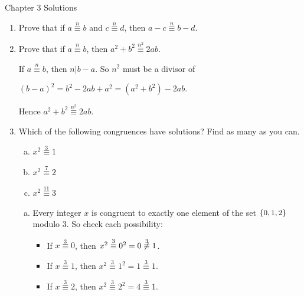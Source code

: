\documentclass[11pt,fleqn,dvipsnames,usenames]{article}
\renewcommand{\headrulewidth}{1pt}
\begin{document}
\fancyhead[L]{\course}
\fancyhead[R]{\term}
\renewcommand{\headrulewidth}{0.4pt}

{\huge Chapter 3 Solutions}
\vsp

\begin{enumerate}
\item Prove that if $a\overset{n}{\equiv}b$ and $c\overset{n}{\equiv}d$, then $a-c\overset{n}{\equiv}b-d$.
\item Prove that if $a\overset{n}{\equiv}b$, then $a^2 + b^2\overset{n^2}{\equiv}2ab$.
\vsmsp

\solution If $a\overset{n}{\equiv}b$, then $n|b-a$.  So $n^2$ must be a divisor of
\begin{center}
$(b-a)^2 = b^2 - 2ab + a^2 = (a^2 + b^2) - 2ab$.
\end{center}
Hence $a^2 + b^2\overset{n^2}{\equiv}2ab$.
\item Which of the following congruences have solutions?  Find as many as you can.
\begin{enumerate}[(a)]
\item $x^2\overset{3}{\equiv}1$
\item $x^2\overset{7}{\equiv}2$
\item $x^2\overset{11}{\equiv}3$
\end{enumerate}
\vsmsp

\solution
\begin{enumerate}[(a)]
\item Every integer $x$ is congruent to exactly one element of the set $\left\{0,1,2\right\}$ modulo $3$.  So check each possibility:
\begin{itemize}[\ ]
\item If $x\overset{3}{\equiv}0$, then $x^2\overset{3}{\equiv}0^2 = 0\not\overset{3}{\equiv}1$.
\item If $x\overset{3}{\equiv}1$, then $x^2\overset{3}{\equiv}1^2 = 1\overset{3}{\equiv}1$.
\item If $x\overset{3}{\equiv}2$, then $x^2\overset{3}{\equiv}2^2 = 4\overset{3}{\equiv}1$.
\end{itemize}


\end{enumerate}
\end{enumerate}
\end{document}
